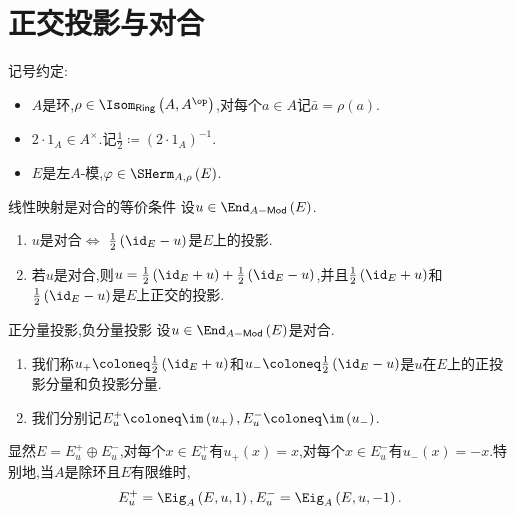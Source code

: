 \section{正交投影与对合}

记号约定:
\begin{itemize}
	\item $A$是环,$\rho\in\Isom_{\mathsf{Ring}}\left(A,A^{\op}\right)$,对每个$a\in A$记$\bar{a}=\rho\left(a\right)$.
	\item $2\cdot 1_{A}\in A^{\times}$.记$\frac{1}{2}\coloneq\left(2\cdot 1_{A}\right)^{-1}$.
	\item $E$是左$A$-模,$\varphi\in\SHerm_{A,\rho}\left(E\right)$.
\end{itemize}

\begin{lemma}{线性映射是对合的等价条件}{}
	设$u\in\End_{A-\mathsf{Mod}}\left(E\right)$.
	\begin{enumerate}
		\item $u$是对合$\iff$ $\frac{1}{2}\left(\id_{E}-u\right)$是$E$上的投影.
		\item 若$u$是对合,则$u=\frac{1}{2}\left(\id_{E}+u\right)+\frac{1}{2}\left(\id_{E}-u\right)$,并且$\frac{1}{2}\left(\id_{E}+u\right)$和$\frac{1}{2}\left(\id_{E}-u\right)$是$E$上正交的投影.
	\end{enumerate}
\end{lemma}

\begin{definition}{正分量投影,负分量投影}{}
	设$u\in\End_{A-\mathsf{Mod}}\left(E\right)$是对合.
	\begin{enumerate}
		\item 我们称$u_{+}\coloneq\frac{1}{2}\left(\id_{E}+u\right)$和$u_{-}\coloneq\frac{1}{2}\left(\id_{E}-u\right)$是$u$在$E$上的正投影分量和负投影分量.
		\item 我们分别记$E_{u}^{+}\coloneq\im\left(u_{+}\right),E_{u}^{-}\coloneq\im\left(u_{-}\right)$.
	\end{enumerate}
\end{definition}

\begin{remark}{}{}
	显然$E=E_{u}^{+}\oplus E_{u}^{-}$,对每个$x\in E_{u}^{+}$有$u_{+}\left(x\right)=x$,对每个$x\in E_{u}^{-}$有$u_{-}\left(x\right)=-x$.特别地,当$A$是除环且$E$有限维时,
	\begin{align*}
		E_{u}^{+}=\Eig_{A}\left(E,u,1\right),E_{u}^{-}=\Eig_{A}\left(E,u,-1\right).
	\end{align*}
\end{remark}

